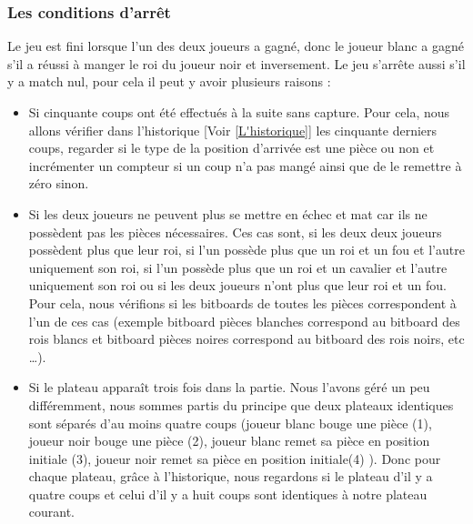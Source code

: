 \huge\documentclass{article}
\begin{document}
\subsubsection{Les conditions d'arrêt} \label{Architecture_condition_d'arrêt}
Le jeu est fini lorsque l'un des deux joueurs a gagné, donc le joueur blanc a gagné s'il a réussi à manger le roi du joueur noir et inversement.\newline
Le jeu s'arrête aussi s'il y a match nul, pour cela il peut y avoir plusieurs raisons :
\begin{itemize}
    \item Si cinquante coups ont été effectués à la suite sans capture.\newline
    Pour cela, nous allons vérifier dans l'historique [Voir \ref{L'historique}] les cinquante derniers coups, regarder si le type de la position d'arrivée est une pièce ou non et incrémenter un compteur si un coup n'a pas mangé ainsi que de le remettre à zéro sinon.
    \item Si les deux joueurs ne peuvent plus se mettre en échec et mat car ils ne possèdent pas les pièces nécessaires.\newline
    Ces cas sont, si les deux deux joueurs possèdent plus que leur roi, si l'un possède plus que un roi et un fou et l'autre uniquement son roi, si l'un possède plus que un roi et un cavalier et l'autre uniquement son roi ou si les deux joueurs n'ont plus que leur roi et un fou.\newline
    Pour cela, nous vérifions si les bitboards de toutes les pièces correspondent à l'un de ces cas (exemple bitboard pièces blanches correspond au bitboard des rois blancs et bitboard pièces noires correspond au bitboard des rois noirs, etc \dots).
    \item Si le plateau apparaît trois fois dans la partie.\newline
    Nous l'avons géré un peu différemment, nous sommes partis du principe que deux plateaux identiques sont séparés d'au moins quatre coups (joueur blanc bouge une pièce (1), joueur noir bouge une pièce (2), joueur blanc remet sa pièce en position initiale (3), joueur noir remet sa pièce en position initiale(4) ).\newline
    Donc pour chaque plateau, grâce à l'historique, nous regardons si le plateau d'il y a quatre coups et celui d'il y a huit coups sont identiques à notre plateau courant.
\end{itemize}
\end{document}
